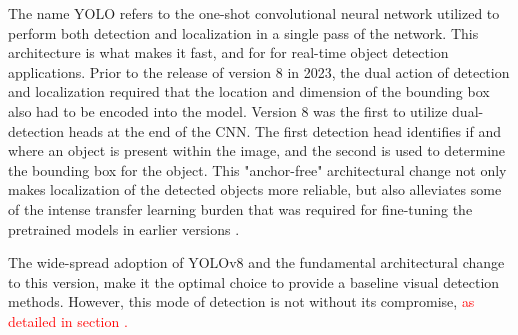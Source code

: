 \documentclass{erauthesis}
\begin{document}
The name YOLO refers to the one-shot convolutional neural network utilized to perform both detection and localization in a single pass of the network.
This architecture is what makes it fast, and for for real-time object detection applications. 
Prior to the release of version 8 in 2023, the dual action of detection and localization required that the location and dimension of the bounding box also had to be encoded into the model.
Version 8 was the first to utilize dual-detection heads at the end of the CNN.
The first detection head identifies if and where an object is present within the image, and the second is used to determine the bounding box for the object.
This "anchor-free" architectural change not only makes localization of the detected objects more reliable, but also alleviates some of the intense transfer learning burden that was required for fine-tuning the pretrained models in earlier versions \cite{ultralytics}.

The wide-spread adoption of YOLOv8 and the fundamental architectural change to this version, make it the optimal choice to provide a baseline visual detection methods.
However, this mode of detection is not without its compromise, \textcolor{red}{as detailed in section .}













\end{document}
